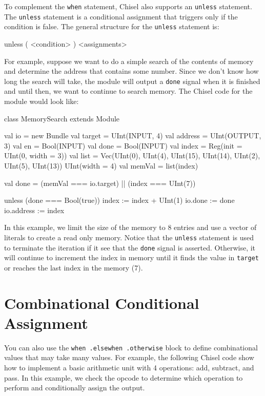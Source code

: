
To complement the \verb+when+ statement, Chisel also supports an \verb+unless+ statement. The \verb+unless+ statement is a conditional assignment that triggers only if the condition is false. The general structure for the \verb+unless+ statement is:

\begin{scala}
unless ( <condition> ) { <assignments> }
\end{scala}

For example, suppose we want to do a simple search of the contents of memory and determine the address that contains some number. Since we don't know how long the search will take, the module will output a \verb+done+ signal when it is finished and until then, we want to continue to search memory. The Chisel code for the module would look like:

\begin{scala}
class MemorySearch extends Module {
  val io = new Bundle {
    val target  = UInt(INPUT,  4)
    val address = UInt(OUTPUT, 3)
    val en      = Bool(INPUT)
    val done    = Bool(INPUT)
  }
  val index  = Reg(init = UInt(0, width = 3))
  val list   = Vec(UInt(0), UInt(4), UInt(15), UInt(14), UInt(2), UInt(5), UInt(13)){ UInt(width = 4) }
  val memVal = list(index)

  val done = (memVal === io.target) || (index === UInt(7))

  unless (done === Bool(true)) {
    index := index + UInt(1)
  }
  io.done    := done
  io.address := index
}
\end{scala}

In this example, we limit the size of the memory to 8 entries and use a vector of literals to create a read only memory. Notice that the \verb+unless+ statement is used to terminate the iteration if it see that the \verb+done+ signal is asserted. Otherwise, it will continue to increment the index in memory until it finds the value in \verb+target+ or reaches the last index in the memory (7).

\section{Combinational Conditional Assignment}

You can also use the \verb+when .elsewhen .otherwise+ block to define combinational values that may take many values. For example, the following Chisel code show how to implement a basic arithmetic unit with 4 operations: add, subtract, and pass. In this example, we check the opcode to determine which operation to perform and conditionally assign the output.


